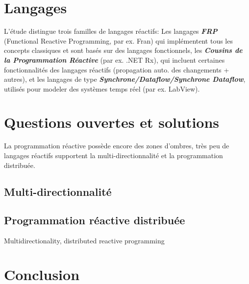 \documentclass[10pt,final]{IEEEtran}
\begin{document}
\section{Langages}

L'étude distingue trois familles de langages réactifs: Les langages \textit{\textbf{FRP}} (Functional Reactive Programming, par ex. Fran) qui implémentent tous les concepts classiques et sont basés sur des langages fonctionnels, les \textit{\textbf{Cousins de la Programmation Réactive}} (par ex. .NET Rx), qui incluent certaines fonctionnalités des langages réactifs (propagation auto. des changements + autres), et les langages de type \textit{\textbf{Synchrone/Dataflow/Synchrone Dataflow}}, utilisés pour modeler des systèmes temps réel (par ex. LabView).

\section{Questions ouvertes et solutions}

La programmation réactive possède encore des zones d'ombres, très peu de langages réactifs
supportent la multi-directionnalité et la programmation distribuée.

\subsection{Multi-directionnalité}

\subsection{Programmation réactive distribuée}

Multidirectionality, distributed reactive programming 

\section{Conclusion}
\end{document}
